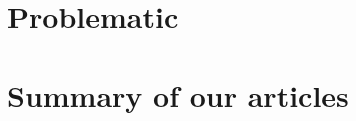\documentclass{article}
\begin{document}
\section{Problematic}


\section{Summary of our articles}
\end{document}
